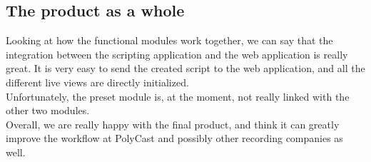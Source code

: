 \subsection*{The product as a whole}
Looking at how the functional modules work together, we can say that the integration between the scripting application and the web application is really great. It is very easy to send the created script to the web application, and all the different live views are directly initialized.\\
Unfortunately, the preset module is, at the moment, not really linked with the other two modules.\\
Overall, we are really happy with the final product, and think it can greatly improve the workflow at PolyCast and possibly other recording companies as well.